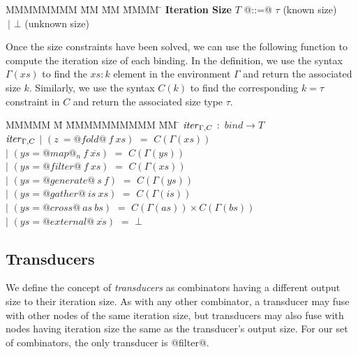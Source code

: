 \begin{tabbing}
MMMMMMMM \= MM       \= MM \= MMMM \= \kill
\textbf{Iteration Size}
 \> $T$         \> @::=@  \> $\tau$        \> (known size) \\
 \>             \> $~|$   \> $\bot$     \> (unknown size) \\
\end{tabbing}

Once the size constraints have been solved, we can use the following function to compute the iteration size of each binding. In the definition, we use the syntax $\Gamma(xs)$ to find the $xs : k$ element in the environment $\Gamma$ and return the associated size $k$. Similarly, we use the syntax $C(k)$ to find the corresponding $k = \tau$ constraint in $C$ and return the associated size type $\tau$.


\begin{tabbing}
MMMMM \= M \= MMMMMMMMMM \= MM \= \kill
$\mathit{iter}_{\Gamma,C}$  
        \>$:$\> $bind \rightarrow T$ 
\\[1ex]
$\mathit{iter}_{\Gamma,C}$
        \> $|$  \> $(z~ = @fold@~ f~xs)$     
                \> $=$ \> $C(\Gamma(xs))$ 
\\
        \> $|$  \> $(ys = @map@_n~f~\overline{xs})$
                \> $=$ \> $C(\Gamma(ys))$ 
\\
        \> $|$  \> $(ys = @filter@~f~xs)$    
                \> $=$ \> $C(\Gamma(xs))$ 
\\
        \> $|$  \> $(ys = @generate@~s~f)$  
                \> $=$ \> $C(\Gamma(ys))$ 
\\
        \> $|$  \> $(ys = @gather@~is~xs)$    
                \> $=$ \> $C(\Gamma(is))$ 
\\
        \> $|$  \> $(ys = @cross@~as~bs)$     
                \> $=$ \> $C(\Gamma(as)) \times C(\Gamma(bs))$ 
\\
        \> $|$  \> $(ys = @external@~\overline{xs})$  
                \> $=$ \> $\bot$ 
\\
\end{tabbing}


\subsection{Transducers}

We define the concept of \emph{transducers} as combinators having a different output size to their iteration size.
As with any other combinator, a transducer may fuse with other nodes of the same iteration size, but transducers may also fuse with nodes having iteration size the same as the transducer's output size.
For our set of combinators, the only transducer is @filter@.

